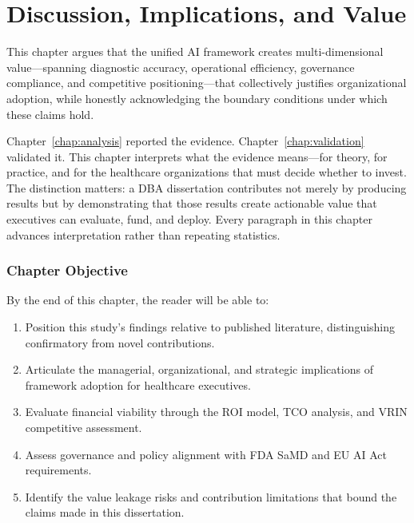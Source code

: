 
\chapter{Discussion, Implications, and Value}
\label{chap:discussion}

This chapter argues that the unified AI framework creates multi-dimensional value---spanning diagnostic accuracy, operational efficiency, governance compliance, and competitive positioning---that collectively justifies organizational adoption, while honestly acknowledging the boundary conditions under which these claims hold.

Chapter~\ref{chap:analysis} reported the evidence. Chapter~\ref{chap:validation} validated it. This chapter interprets what the evidence means---for theory, for practice, and for the healthcare organizations that must decide whether to invest. The distinction matters: a DBA dissertation contributes not merely by producing results but by demonstrating that those results create actionable value that executives can evaluate, fund, and deploy. Every paragraph in this chapter advances interpretation rather than repeating statistics.

\subsection{Chapter Objective}
\label{sec:disc_objective}

By the end of this chapter, the reader will be able to:
\begin{enumerate}[label=\alph*)]
    \item Position this study's findings relative to published literature, distinguishing confirmatory from novel contributions.
    \item Articulate the managerial, organizational, and strategic implications of framework adoption for healthcare executives.
    \item Evaluate financial viability through the ROI model, TCO analysis, and VRIN competitive assessment.
    \item Assess governance and policy alignment with FDA SaMD and EU AI Act requirements.
    \item Identify the value leakage risks and contribution limitations that bound the claims made in this dissertation.
\end{enumerate}


